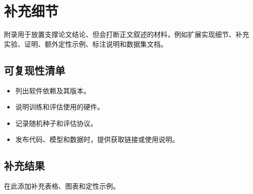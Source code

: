 \section{补充细节}
\label{sec:appendix_details}

附录用于放置支撑论文结论、但会打断正文叙述的材料，例如扩展实现细节、补充实验、证明、额外定性示例、标注说明和数据集文档。

\subsection{可复现性清单}

\begin{itemize}
  \item 列出软件依赖及其版本。
  \item 说明训练和评估使用的硬件。
  \item 记录随机种子和评估协议。
  \item 发布代码、模型和数据时，提供获取链接或使用说明。
\end{itemize}

\subsection{补充结果}

在此添加补充表格、图表和定性示例。
